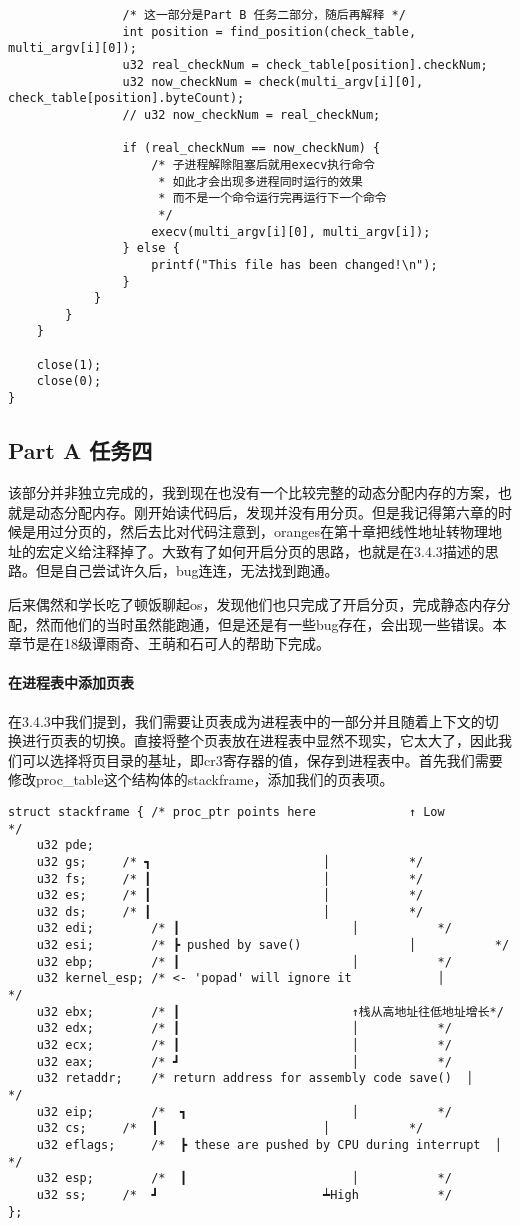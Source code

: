 \documentclass{whureport}
\begin{document}
\begin{lstlisting}
				/* 这一部分是Part B 任务二部分，随后再解释 */
                int position = find_position(check_table, multi_argv[i][0]);
                u32 real_checkNum = check_table[position].checkNum;
                u32 now_checkNum = check(multi_argv[i][0], check_table[position].byteCount);
                // u32 now_checkNum = real_checkNum;

                if (real_checkNum == now_checkNum) {
                	/* 子进程解除阻塞后就用execv执行命令
                	 * 如此才会出现多进程同时运行的效果
                	 * 而不是一个命令运行完再运行下一个命令
                	 */
                    execv(multi_argv[i][0], multi_argv[i]);
                } else {
                    printf("This file has been changed!\n");
                }
            }
        }
    }

    close(1);
    close(0);
}
\end{lstlisting}


\subsection{Part A 任务四}
该部分并非独立完成的，我到现在也没有一个比较完整的动态分配内存的方案，也就是动态分配内存。刚开始读代码后，发现并没有用分页。但是我记得第六章的时候是用过分页的，然后去比对代码注意到，oranges在第十章把线性地址转物理地址的宏定义给注释掉了。大致有了如何开启分页的思路，也就是在3.4.3描述的思路。但是自己尝试许久后，bug连连，无法找到跑通。

后来偶然和学长吃了顿饭聊起os，发现他们也只完成了开启分页，完成静态内存分配，然而他们的当时虽然能跑通，但是还是有一些bug存在，会出现一些错误。本章节是在18级谭雨奇、王萌和石可人的帮助下完成。

\paragraph{在进程表中添加页表} 在3.4.3中我们提到，我们需要让页表成为进程表中的一部分并且随着上下文的切换进行页表的切换。直接将整个页表放在进程表中显然不现实，它太大了，因此我们可以选择将页目录的基址，即cr3寄存器的值，保存到进程表中。首先我们需要修改proc\_table这个结构体的stackframe，添加我们的页表项。

\begin{lstlisting}
struct stackframe { /* proc_ptr points here				↑ Low			*/
    u32 pde;
	u32	gs;		/* ┓						│			*/
	u32	fs;		/* ┃						│			*/
	u32	es;		/* ┃						│			*/
	u32	ds;		/* ┃						│			*/
	u32	edi;		/* ┃						│			*/
	u32	esi;		/* ┣ pushed by save()				│			*/
	u32	ebp;		/* ┃						│			*/
	u32	kernel_esp;	/* <- 'popad' will ignore it			│			*/
	u32	ebx;		/* ┃						↑栈从高地址往低地址增长*/		
	u32	edx;		/* ┃						│			*/
	u32	ecx;		/* ┃						│			*/
	u32	eax;		/* ┛						│			*/
	u32	retaddr;	/* return address for assembly code save()	│			*/
	u32	eip;		/*  ┓						│			*/
	u32	cs;		/*  ┃						│			*/
	u32	eflags;		/*  ┣ these are pushed by CPU during interrupt	│			*/
	u32	esp;		/*  ┃						│			*/
	u32	ss;		/*  ┛						┷High			*/
};
\end{lstlisting}
\end{document}
